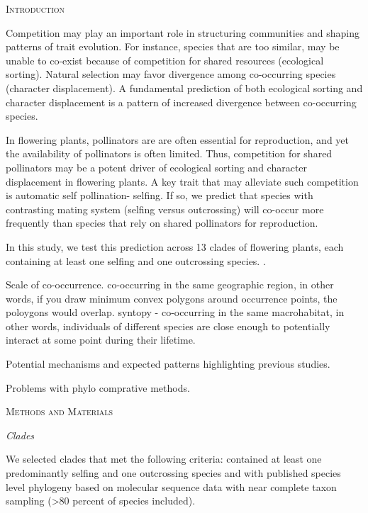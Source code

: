 \documentclass[12pt,letterpaper]{article}
\renewcommand{\section}[1]{%
\bigskip
\begin{center}
\begin{Large}
\normalfont\scshape #1
\medskip
\end{Large}
\end{center}}
\renewcommand{\subsection}[1]{%
\bigskip
\begin{center}
\begin{large}
\normalfont\itshape #1
\end{large}
\end{center}}
\begin{document}
\section{Introduction}

Competition may play an important role in structuring communities and shaping patterns of trait evolution.  For instance, species that are too similar, may be unable to co-exist because of competition for shared resources (ecological sorting).  Natural selection may favor divergence among co-occurring species (character displacement). A fundamental prediction of both ecological sorting and character displacement is a pattern of increased divergence between co-occurring species.  

In flowering plants, pollinators are are often essential for reproduction, and yet the availability of pollinators is often limited.  Thus, competition for shared pollinators may be a potent driver of ecological sorting and character displacement in flowering plants.  A key trait that may alleviate such competition is automatic self pollination- selfing.  If so, we predict that species with contrasting mating system (selfing versus outcrossing) will co-occur more frequently than species that rely on shared pollinators for reproduction.  

In this study, we test this prediction across 13 clades of flowering plants, each containing at least one selfing and one outcrossing species. \citep{Crampton2011}.

Scale of co-occurrence. co-occurring in the same geographic region, in other words, if you draw minimum convex polygons around occurrence points, the poloygons would overlap.  syntopy - co-occurring in the same macrohabitat, in other words, individuals of different species are close enough to potentially interact at some point during their lifetime.  

Potential mechanisms and expected patterns highlighting previous studies.

Problems with phylo comprative methods.

\section{Methods and Materials}

\subsection{Clades}

We selected clades that met the following criteria: contained at least one predominantly selfing and one outcrossing species and with published species level phylogeny based on molecular sequence data with near complete taxon sampling (>80 percent of species included). 
\end{document}
